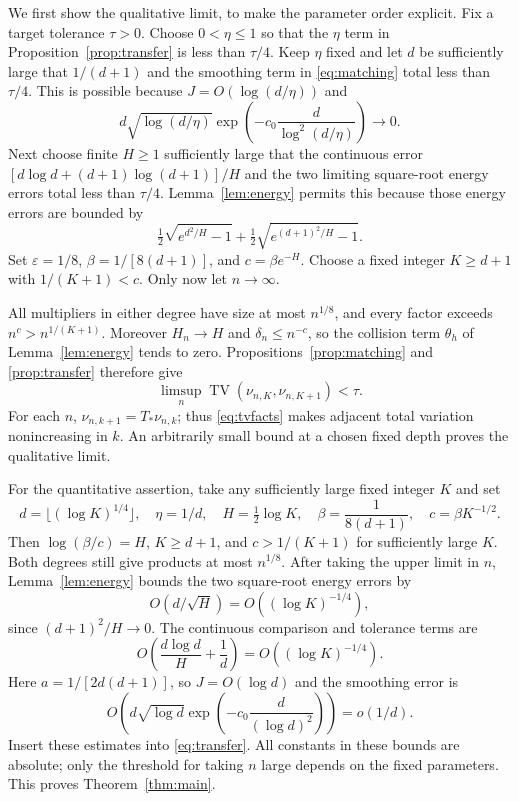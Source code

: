 \documentclass[11pt]{article}
\theoremstyle{remark}\newtheorem{remark}[theorem]{Remark}
\DeclareMathOperator{\TV}{TV}
\begin{document}
We first show the qualitative limit, to make the parameter order explicit. Fix a target tolerance $\tau>0$. Choose $0<\eta\le1$ so that the $\eta$ term in Proposition~\ref{prop:transfer} is less than $\tau/4$. Keep $\eta$ fixed and let $d$ be sufficiently large that $1/(d+1)$ and the smoothing term in \eqref{eq:matching} total less than $\tau/4$. This is possible because $J=O(\log(d/\eta))$ and
\[
 d\sqrt{\log(d/\eta)}\exp\left(-c_0\frac d{\log^2(d/\eta)}\right)\longrightarrow0.
\]
Next choose finite $H\ge1$ sufficiently large that the continuous error $[d\log d+(d+1)\log(d+1)]/H$ and the two limiting square-root energy errors total less than $\tau/4$. Lemma~\ref{lem:energy} permits this because those energy errors are bounded by
\[
 \tfrac12\sqrt{e^{d^2/H}-1}
 +\tfrac12\sqrt{e^{(d+1)^2/H}-1}.
\]
Set $\varepsilon=1/8$, $\beta=1/[8(d+1)]$, and $c=\beta e^{-H}$. Choose a fixed integer $K\ge d+1$ with $1/(K+1)<c$. Only now let $n\to\infty$.

All multipliers in either degree have size at most $n^{1/8}$, and every factor exceeds $n^c>n^{1/(K+1)}$. Moreover $H_n\to H$ and $\delta_n\le n^{-c}$, so the collision term $\theta_h$ of Lemma~\ref{lem:energy} tends to zero. Propositions~\ref{prop:matching} and \ref{prop:transfer} therefore give
\[
 \limsup_n\TV(\nu_{n,K},\nu_{n,K+1})<\tau.
\]
For each $n$, $\nu_{n,k+1}=T_*\nu_{n,k}$; thus \eqref{eq:tvfacts} makes adjacent total variation nonincreasing in $k$. An arbitrarily small bound at a chosen fixed depth proves the qualitative limit.

For the quantitative assertion, take any sufficiently large fixed integer $K$ and set
\begin{equation}\label{eq:parameters}
 d=\lfloor(\log K)^{1/4}\rfloor,\quad \eta=1/d,\quad
 H=\tfrac12\log K,\quad
 \beta=\frac1{8(d+1)},\quad c=\beta K^{-1/2}.
\end{equation}
Then $\log(\beta/c)=H$, $K\ge d+1$, and $c>1/(K+1)$ for sufficiently large $K$. Both degrees still give products at most $n^{1/8}$. After taking the upper limit in $n$, Lemma~\ref{lem:energy} bounds the two square-root energy errors by
\[
 O(d/\sqrt H)=O((\log K)^{-1/4}),
\]
since $(d+1)^2/H\to0$. The continuous comparison and tolerance terms are
\[
 O\left(\frac{d\log d}H+\frac1d\right)=O((\log K)^{-1/4}).
\]
Here $a=1/[2d(d+1)]$, so $J=O(\log d)$ and the smoothing error is
\[
 O\left(d\sqrt{\log d}\exp\left(-c_0\frac d{(\log d)^2}\right)\right)=o(1/d).
\]
Insert these estimates into \eqref{eq:transfer}. All constants in these bounds are absolute; only the threshold for taking $n$ large depends on the fixed parameters. This proves Theorem~\ref{thm:main}.
\end{document}
